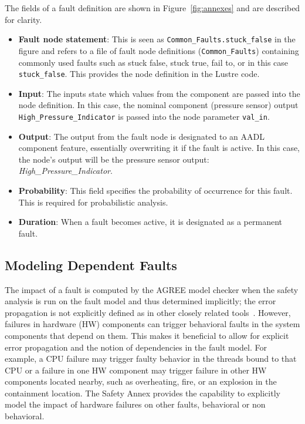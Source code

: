 The fields of a fault definition are shown in Figure~\ref{fig:annexes} and are described for clarity.
\begin{itemize}
\item \textbf{Fault node statement}: This is seen as \texttt{Common\_Faults.stuck\_false} in the figure and refers to a file of fault node definitions (\texttt{Common\_Faults}) containing commonly used faults such as stuck false, stuck true, fail to, or in this case \texttt{stuck\_false}. This provides the node definition in the Lustre code.
\item \textbf{Input}: The inputs state which values from the component are passed into the node definition. In this case, the nominal component (pressure sensor) output \texttt{High\_Pressure\_Indicator} is passed into the node parameter \texttt{val\_in}. 
\item \textbf{Output}: The output from the fault node is designated to an AADL component feature, essentially overwriting it if the fault is active. In this case, the node's output will be the pressure sensor output: \textit{High\_Pressure\_Indicator}. 
\item \textbf{Probability}: This field specifies the probability of occurrence for this fault. This is required for probabilistic analysis.
\item \textbf{Duration}: When a fault becomes active, it is designated as a permanent fault. 
\end{itemize}

\subsection{Modeling Dependent Faults}
The impact of a fault is computed by the AGREE model checker when the safety analysis is run on the fault model and thus determined implicitly; the error propagation is not explicitly defined as in other closely related tools~\cite{EMV2,compass30toolset}. However, failures in hardware (HW) components can trigger behavioral faults in the system components that depend on them. This makes it beneficial to allow for explicit error propagation and the notion of dependencies in the fault model. For example, a CPU failure may trigger faulty behavior in the threads bound to that CPU or a failure in one HW component may trigger failure in other HW components located nearby, such as overheating, fire, or an explosion in the containment location. The Safety Annex provides the capability to explicitly model the impact of hardware failures on other faults, behavioral or non behavioral. 

